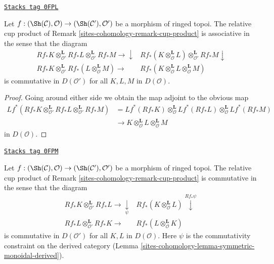 \begin{lemma}
\label{sites-cohomology-lemma-cup-product-associative}
\href{https://stacks.math.columbia.edu/tag/0FPL}{\texttt{Stacks tag 0FPL}}

Let $f : (\Sh(\mathcal{C}), \mathcal{O}) \to (\Sh(\mathcal{C}'), \mathcal{O}')$
be a morphism of ringed topoi. The relative cup product of
Remark \ref{sites-cohomology-remark-cup-product} is associative in the sense that
the diagram
$$
\begin{array}{cc}Rf_*K \otimes_{\mathcal{O}'}^\mathbf{L}
Rf_*L \otimes_{\mathcal{O}'}^\mathbf{L}
Rf_*M \longrightarrow\downarrow & Rf_*(K \otimes_\mathcal{O}^\mathbf{L} L)
\otimes_{\mathcal{O}'}^\mathbf{L} Rf_*M \downarrow \\ Rf_*K \otimes_{\mathcal{O}'}^\mathbf{L}
Rf_*(L \otimes_\mathcal{O}^\mathbf{L} M) \longrightarrow & Rf_*(K \otimes_\mathcal{O}^\mathbf{L}
L \otimes_\mathcal{O}^\mathbf{L} M)\end{array}
$$
is commutative in $D(\mathcal{O}')$ for all $K, L, M$ in $D(\mathcal{O})$.
\end{lemma}

\begin{proof}
Going around either side we obtain the map adjoint to the obvious map
\begin{align*}
Lf^*(Rf_*K \otimes_{\mathcal{O}'}^\mathbf{L}
Rf_*L \otimes_{\mathcal{O}'}^\mathbf{L}
Rf_*M) & =
Lf^*(Rf_*K) \otimes_\mathcal{O}^\mathbf{L}
Lf^*(Rf_*L) \otimes_\mathcal{O}^\mathbf{L}
Lf^*(Rf_*M) \\
& \to
K \otimes_\mathcal{O}^\mathbf{L}
L \otimes_\mathcal{O}^\mathbf{L} M
\end{align*}
in $D(\mathcal{O})$.
\end{proof}

\begin{lemma}
\label{sites-cohomology-lemma-cup-product-commutative}
\href{https://stacks.math.columbia.edu/tag/0FPM}{\texttt{Stacks tag 0FPM}}

Let $f : (\Sh(\mathcal{C}), \mathcal{O}) \to (\Sh(\mathcal{C}'), \mathcal{O}')$
be a morphism of ringed topoi. The relative cup product of
Remark \ref{sites-cohomology-remark-cup-product} is commutative in the sense that
the diagram
$$
\begin{array}{cc}Rf_*K \otimes_{\mathcal{O}'}^\mathbf{L} Rf_*L \longrightarrow\underset{\psi}{\downarrow} & Rf_*(K \otimes_\mathcal{O}^\mathbf{L} L) \overset{Rf_*\psi}{\downarrow} \\ Rf_*L \otimes_{\mathcal{O}'}^\mathbf{L} Rf_*K \longrightarrow & Rf_*(L \otimes_\mathcal{O}^\mathbf{L} K)\end{array}
$$
is commutative in $D(\mathcal{O}')$ for all $K, L$ in $D(\mathcal{O})$.
Here $\psi$ is the commutativity constraint on the derived category
(Lemma \ref{sites-cohomology-lemma-symmetric-monoidal-derived}).
\end{lemma}

